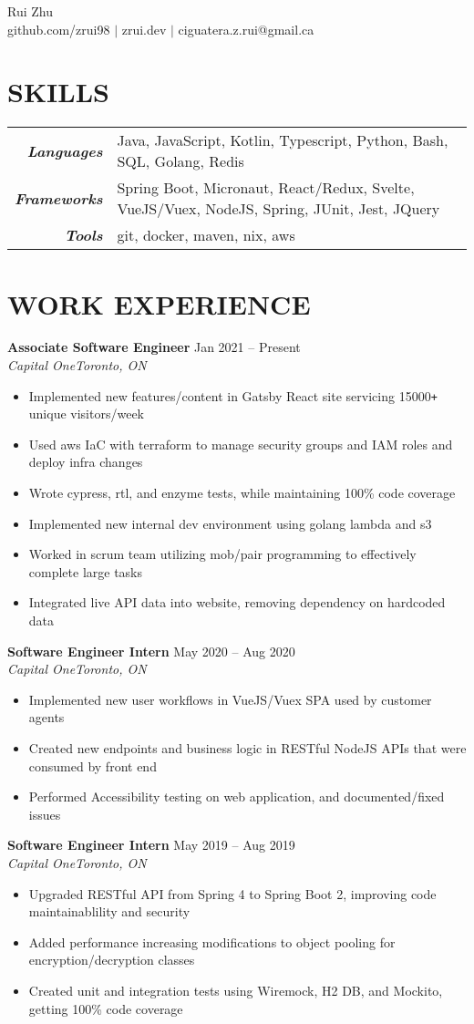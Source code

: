 \documentclass[letterpaper]{article}
\newcommand{\Header}[2]{\begin{center}
	\huge\usefont{OT1}{lmss}{m}{n}
		#1 \\
	\small #2
\end{center}}
\newcommand{\SplitEntry}[2]{\textbf{\textit{#1}} & #2\\}
\newcommand{\NewPart}[1]{\section*{\uppercase{\large\textbf{#1}}}}
\newcommand{\DatedEntry}[5]{\large\textbf{#1}
	\hfill \small#2\\
	\textit{#3}\hfill\textit{#4}\\\vspace{0.1cm}
	#5\vspace{0.1cm}
}
\begin{document}
\Header{Rui Zhu}{github.com/zrui98 $|$ zrui.dev $|$ ciguatera.z.rui@gmail.ca}\vspace{-0.5cm}

\NewPart{Skills}{}
\begin{tabular}{r|l}
	\SplitEntry{Languages}{Java, JavaScript, Kotlin, Typescript, Python, Bash, SQL, Golang, Redis}
	\SplitEntry{Frameworks}{Spring Boot, Micronaut, React/Redux, Svelte, VueJS/Vuex, NodeJS, Spring, JUnit, Jest, JQuery}
	\SplitEntry{Tools}{git, docker, maven, nix, aws}
\end{tabular}\vspace{-0.2cm}

\NewPart{Work Experience}{}
\DatedEntry{Associate Software Engineer}
{Jan 2021 -- Present}
{Capital One}
{Toronto, ON}
{\begin{itemize}[nolistsep]
	\item Implemented new features/content in Gatsby React site servicing 15000\texttt{+} unique visitors/week
	\item Used aws IaC with terraform to manage security groups and IAM roles and deploy infra changes
	\item Wrote cypress, rtl, and enzyme tests, while maintaining 100\% code coverage
	\item Implemented new internal dev environment using golang lambda and s3
	\item Worked in scrum team utilizing mob/pair programming to effectively complete large tasks
	\item Integrated live API data into website, removing dependency on hardcoded data
\end{itemize}}
\DatedEntry{Software Engineer Intern}
{May 2020 -- Aug 2020}
{Capital One}
{Toronto, ON}
{\begin{itemize}[nolistsep]
	\item Implemented new user workflows in VueJS/Vuex SPA used by customer agents
	\item Created new endpoints and business logic in RESTful NodeJS APIs that were consumed by front end
	\item Performed Accessibility testing on web application, and documented/fixed issues
\end{itemize}}
\DatedEntry{Software Engineer Intern}
{May 2019 -- Aug 2019}
{Capital One}
{Toronto, ON}
{\begin{itemize}[nolistsep]
	\item Upgraded RESTful API from Spring 4 to Spring Boot 2, improving code maintainablility and security
	\item Added performance increasing modifications to object pooling for encryption/decryption classes
	\item Created unit and integration tests using Wiremock, H2 DB, and Mockito, getting 100\% code coverage
\end{itemize}}
\end{document}
